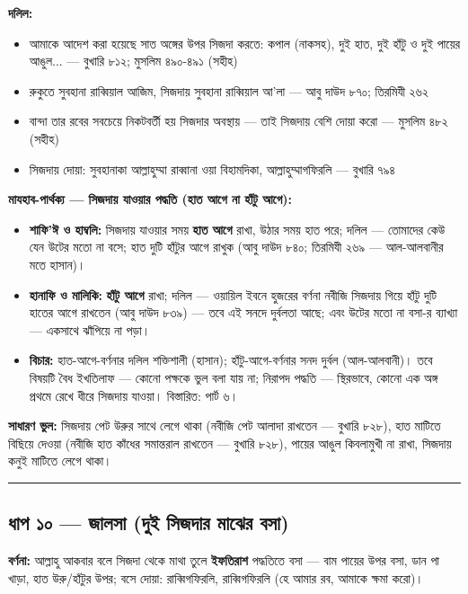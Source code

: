 \textbf{দলিল:}
\begin{itemize}
\item {}আমাকে আদেশ করা হয়েছে সাত অঙ্গের উপর সিজদা করতে: কপাল (নাকসহ), দুই হাত, দুই হাঁটু ও দুই পায়ের আঙুল... — বুখারি ৮১২; মুসলিম ৪৯০-৪৯১ (সহীহ)
\item {}রুকুতে সুবহানা রাব্বিয়াল আজিম, সিজদায় সুবহানা রাব্বিয়াল আ'লা — আবু দাউদ ৮৭০; তিরমিযী ২৬২
\item {}বান্দা তার রবের সবচেয়ে নিকটবর্তী হয় সিজদার অবস্থায় — তাই সিজদায় বেশি দোয়া করো — মুসলিম ৪৮২ (সহীহ)
\item সিজদায় দোয়া: সুবহানাকা আল্লাহুম্মা রাব্বানা ওয়া বিহামদিকা, আল্লাহুম্মাগফিরলি — বুখারি ৭৯৪
\end{itemize}
\textbf{মাযহাব-পার্থক্য — সিজদায় যাওয়ার পদ্ধতি (হাত আগে না হাঁটু আগে):}
\begin{itemize}
\item \textbf{শাফি'ঈ ও হাম্বলি:} সিজদায় যাওয়ার সময় \textbf{হাত আগে} রাখা, উঠার সময় হাত পরে; দলিল — তোমাদের কেউ যেন উটের মতো না বসে; হাত দুটি হাঁটুর আগে রাখুক (আবু দাউদ ৮৪০; তিরমিযী ২৬৯ — আল-আলবানীর মতে হাসান)।
\item \textbf{হানাফি ও মালিকি:} \textbf{হাঁটু আগে} রাখা; দলিল — ওয়ায়িল ইবনে হুজরের বর্ণনা নবীজি সিজদায় গিয়ে হাঁটু দুটি হাতের আগে রাখতেন (আবু দাউদ ৮৩৯) — তবে এই সনদে দুর্বলতা আছে; এবং উটের মতো না বসা-র ব্যাখ্যা — একসাথে ঝাঁপিয়ে না পড়া।
\item \textbf{বিচার:} হাত-আগে-বর্ণনার দলিল শক্তিশালী (হাসান); হাঁটু-আগে-বর্ণনার সনদ দুর্বল (আল-আলবানী)। তবে বিষয়টি বৈধ ইখতিলাফ — কোনো পক্ষকে ভুল বলা যায় না; নিরাপদ পদ্ধতি — স্থিরভাবে, কোনো এক অঙ্গ প্রথমে রেখে ধীরে সিজদায় যাওয়া। বিস্তারিত: পার্ট ৬।
\end{itemize}
\textbf{সাধারণ ভুল:} সিজদায় পেট উরুর সাথে লেগে থাকা (নবীজি পেট আলাদা রাখতেন — বুখারি ৮২৮), হাত মাটিতে বিছিয়ে দেওয়া (নবীজি হাত কাঁধের সমান্তরাল রাখতেন — বুখারি ৮২৮), পায়ের আঙুল কিবলামুখী না রাখা, সিজদায় কনুই মাটিতে লেগে থাকা।

\medskip\hrule\medskip

\subsection*{ধাপ ১০ — জালসা (দুই সিজদার মাঝের বসা)}

\textbf{বর্ণনা:} আল্লাহু আকবার বলে সিজদা থেকে মাথা তুলে \textbf{ইফতিরাশ} পদ্ধতিতে বসা — বাম পায়ের উপর বসা, ডান পা খাড়া, হাত উরু/হাঁটুর উপর; বসে দোয়া: রাব্বিগফিরলি, রাব্বিগফিরলি (হে আমার রব, আমাকে ক্ষমা করো)।

